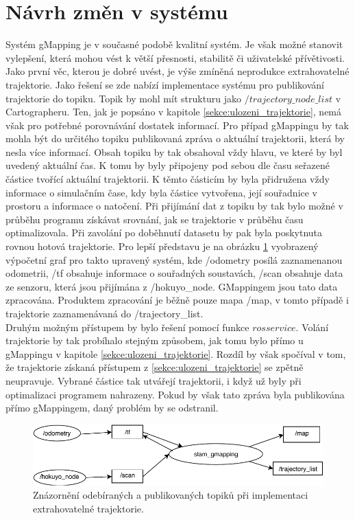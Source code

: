 \documentclass[12pt]{report}
\begin{document}
\newpage
\section{Návrh změn v systému} \label{kapitola:navrh zmen}
Systém gMapping je v současné podobě kvalitní systém. Je však možné stanovit vylepšení, která mohou vést k větší přesnosti, stabilitě či uživatelské přívětivosti.\\
\indent Jako první věc, kterou je dobré uvést, je výše zmíněná neprodukce extrahovatelné trajektorie. Jako řešení se zde nabízí implementace systému pro publikování trajektorie do topiku. Topik by mohl mít strukturu jako $/trajectory\_node\_list$ v Cartographeru. Ten, jak je popsáno v kapitole \ref{sekce:ulozeni_trajektorie}, nemá však pro potřebné porovnávání dostatek informací. Pro případ gMappingu by tak mohla být do určitého topiku publikovaná zpráva o aktuální trajektorii, která by nesla více informací. Obsah topiku by tak obsahoval vždy hlavu, ve které by byl uvedený aktuální čas. K tomu by byly připojeny pod sebou dle času seřazené částice tvořící aktuální trajektorii. K těmto částicím by byla přidružena vždy informace o simulačním čase, kdy byla částice vytvořena, její souřadnice v prostoru a informace o natočení. Při přijímání dat z topiku by tak bylo možné v průběhu programu získávat srovnání, jak se trajektorie v průběhu času optimalizovala. Při zavolání po doběhnutí datasetu by pak byla poskytnuta rovnou hotová trajektorie. Pro lepší představu je na obrázku \ref{fig:gmapping_graph} vyobrazený výpočetní graf pro takto upravený systém, kde /odometry posílá zaznamenanou odometrii, /tf obsahuje informace o souřadných soustavách, /scan obsahuje data ze senzoru, která jsou přijímána z /hokuyo\_node. GMappingem jsou tato data zpracována. Produktem zpracování je běžně pouze mapa /map, v tomto případě i trajektorie zaznamenávaná do /trajectory\_list.\\
\indent Druhým možným přístupem by bylo řešení pomocí funkce $rosservice$. Volání trajektorie by tak probíhalo stejným způsobem, jak tomu bylo přímo u gMappingu v kapitole \ref{sekce:ulozeni_trajektorie}. Rozdíl by však spočíval v tom, že trajektorie získaná přístupem z \ref{sekce:ulozeni_trajektorie} se zpětně neupravuje. Vybrané částice tak utvářejí trajektorii, i když už byly při optimalizaci programem nahrazeny. Pokud by však tato zpráva byla publikována přímo gMappingem, daný problém by se odstranil.
\begin{figure}[!ht]
	\begin{center}
		\includegraphics[width=0.7\columnwidth]{imgs/gmapping_graph.pdf}
	\end{center}
	\caption{Znázornění odebíraných a publikovaných topiků při implementaci extrahovatelné trajektorie.}
	\label{fig:gmapping_graph}
\end{figure}
\end{document}
